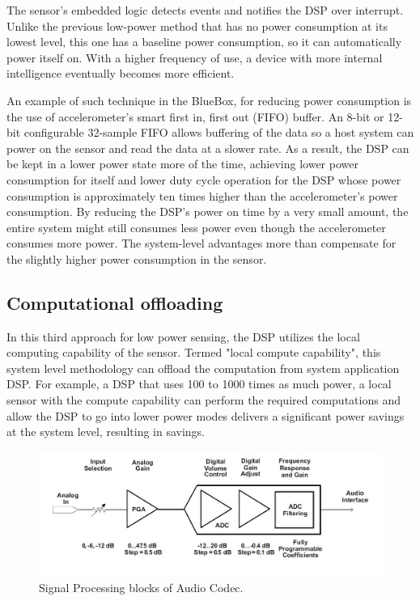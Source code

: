  \hspace{10mm}The sensor's embedded logic detects events and notifies the DSP over interrupt. Unlike the previous low-power method that has no power consumption at its lowest level, this one has a baseline power consumption, so it can automatically power itself on. With a higher frequency of use, a device with more internal intelligence eventually becomes more efficient. 
 
\hspace{10mm}An example of such technique in the BlueBox, for reducing power consumption is the use of accelerometer’s smart first in, first out (FIFO) buffer. An 8-bit or 12-bit configurable 32-sample FIFO allows buffering of the data so a host system can power on the sensor and read the data at a slower rate. As a result, the DSP can be kept in a lower power state more of 
 the time, achieving lower power consumption for itself and lower duty cycle operation for the DSP whose power consumption is approximately ten times higher than the accelerometer’s power consumption. By reducing the DSP’s power on time by a very small amount, the entire system might still consumes less power even though the accelerometer consumes more power. The system-level advantages more than compensate for the slightly 
 higher power consumption in the sensor. 
 
 \subsection{Computational offloading}
 In this third approach for low power sensing, the DSP utilizes the local computing capability of the sensor. Termed "local compute capability", this system level methodology can offload the computation from system application DSP. For example, a DSP that uses 100 to 1000 times as much power, a local sensor with the compute capability can perform the required computations and allow the DSP to go into lower power modes delivers a significant power savings at the system level, resulting in savings.  
 
  \begin{figure}[h]
 	\centering
 	\includegraphics[scale = 0.5 ]{AIC_processingBlock.JPG}
 	\caption{Signal Processing blocks of Audio Codec. \cite{audiocodec} \label{AIC_processingBlock}}
 \end{figure}
 
